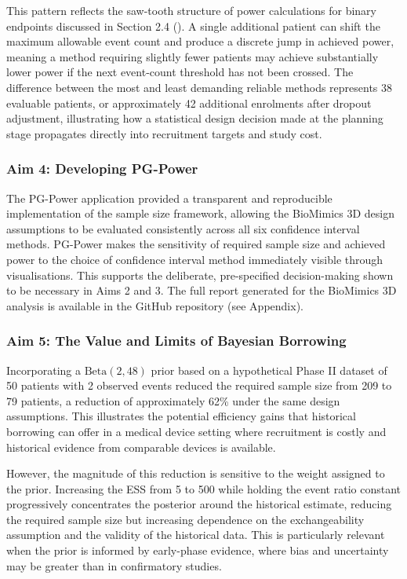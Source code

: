 \documentclass{article}
\begin{document}
This pattern reflects the saw-tooth structure of power calculations for
binary endpoints discussed in Section 2.4
(). A single additional patient
can shift the maximum allowable event count and produce a discrete jump
in achieved power, meaning a method requiring slightly fewer patients
may achieve substantially lower power if the next event-count threshold
has not been crossed. The difference between the most and least
demanding reliable methods represents 38 evaluable patients, or
approximately 42 additional enrolments after dropout adjustment,
illustrating how a statistical design decision made at the planning
stage propagates directly into recruitment targets and study cost.

\subsubsection{Aim 4: Developing
PG-Power}\label{aim-4-developing-pg-power}

The PG-Power application provided a transparent and reproducible
implementation of the sample size framework, allowing the BioMimics 3D
design assumptions to be evaluated consistently across all six
confidence interval methods. PG-Power makes the sensitivity of required
sample size and achieved power to the choice of confidence interval
method immediately visible through visualisations. This supports the
deliberate, pre-specified decision-making shown to be necessary in Aims
2 and 3. The full report generated for the BioMimics 3D analysis is
available in the GitHub repository (see Appendix).

\subsubsection{Aim 5: The Value and Limits of Bayesian
Borrowing}\label{aim-5-the-value-and-limits-of-bayesian-borrowing}

Incorporating a \(\text{Beta}(2, 48)\) prior based on a hypothetical
Phase II dataset of 50 patients with 2 observed events reduced the
required sample size from 209 to 79 patients, a reduction of
approximately 62\% under the same design assumptions. This illustrates
the potential efficiency gains that historical borrowing can offer in a
medical device setting where recruitment is costly and historical
evidence from comparable devices is available.

However, the magnitude of this reduction is sensitive to the weight
assigned to the prior. Increasing the ESS from 5 to 500 while holding
the event ratio constant progressively concentrates the posterior around
the historical estimate, reducing the required sample size but
increasing dependence on the exchangeability assumption and the validity
of the historical data. This is particularly relevant when the prior is
informed by early-phase evidence, where bias and uncertainty may be
greater than in confirmatory studies.
\end{document}
